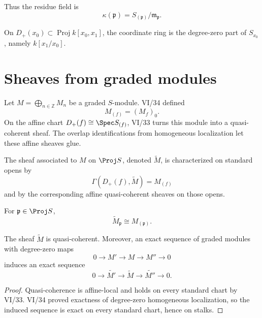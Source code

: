 Thus the residue field is
\[
\kappa(\mathfrak p)=S_{(\mathfrak p)}/\mathfrak m_{\mathfrak p}.
\]



\begin{example}\label{ex:vi35-expand-02}
On $D_+(x_0)\subset\operatorname{Proj}k[x_0,x_1]$, the coordinate ring is the degree-zero part of $S_{x_0}$, namely $k[x_1/x_0]$.
\end{example}
\section{Sheaves from graded modules}
Let \(M=\bigoplus_{n\in\mathbb Z}M_n\) be a graded \(S\)-module.  VI/34 defined
\[
M_{(f)}=(M_f)_0.
\]
On the affine chart \(D_+(f)\cong\Spec S_{(f)}\), VI/33 turns this module into a quasi-coherent sheaf.  The overlap identifications from homogeneous localization let these affine sheaves glue.

\begin{definition}
The sheaf associated to \(M\) on \(\Proj S\), denoted \(\widetilde M\), is characterized on standard opens by
\[
\boxed{\Gamma(D_+(f),\widetilde M)=M_{(f)}}
\]
and by the corresponding affine quasi-coherent sheaves on those opens.
\end{definition}

\begin{proposition}
For \(\mathfrak p\in\Proj S\),
\[
\widetilde M_{\mathfrak p}\cong M_{(\mathfrak p)}.
\]
\end{proposition}

\begin{theorem}
The sheaf \(\widetilde M\) is quasi-coherent.  Moreover, an exact sequence of graded modules with degree-zero maps
\[
0\to M'\to M\to M''\to0
\]
induces an exact sequence
\[
0\to\widetilde{M'}\to\widetilde M\to\widetilde{M''}\to0.
\]
\end{theorem}

\begin{proof}
Quasi-coherence is affine-local and holds on every standard chart by VI/33.  VI/34 proved exactness of degree-zero homogeneous localization, so the induced sequence is exact on every standard chart, hence on stalks.
\end{proof}

